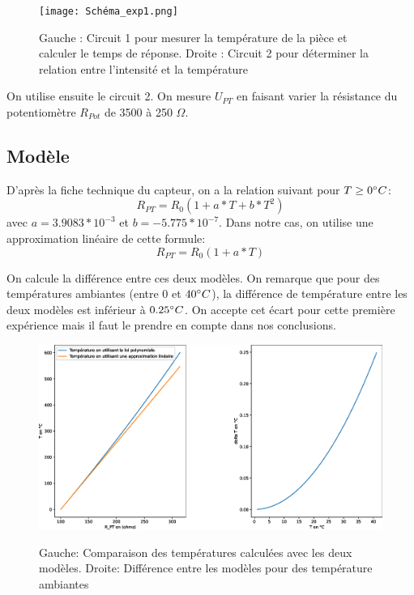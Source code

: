 \documentclass[12pt]{article}
\begin{document}
\newpage
\begin{figure}[h!]
	\begin{center}
		\texttt{[image: Schéma\_exp1.png]}
		\label{Schéma_exp1}
		\caption{Gauche : Circuit 1 pour mesurer la température de la pièce et calculer le temps de réponse. Droite : Circuit 2 pour déterminer la relation entre l'intensité et la température}
	\end{center}
\end{figure}

On utilise ensuite le circuit 2. On mesure $U_{PT}$ en faisant varier la résistance du potentiomètre $R_{Pot}$ de 3500 à 250 $\Omega$.

\subsection{Modèle}
D'après la fiche technique du capteur, on a la relation suivant pour $T\geq 0\degree C$:
\begin{equation}
R_{PT}=R_0(1+a*T+b*T^2)
\end{equation}
avec $a=3.9083*10^{-3}$ et $b=-5.775*10^{-7}$. Dans notre cas, on utilise une approximation linéaire de cette formule:
\begin{equation}
R_{PT}=R_0(1+a*T)
\label{Modèle_linéaire}
\end{equation}

On calcule la différence entre ces deux modèles. On remarque que pour des températures ambiantes (entre $0$ et $40\degree C$), la différence de température entre les deux modèles est inférieur à $0.25\degree C$. On accepte cet écart pour cette première expérience mais il faut le prendre en compte dans nos conclusions. 
\begin{figure}[h!]
	\begin{center}
		\includegraphics[scale=0.3]{Comparaison.eps}
		\label{Comparaison}
		\caption{Gauche: Comparaison des températures calculées avec les deux modèles. Droite: Différence entre les modèles pour des température ambiantes}
	\end{center}
\end{figure}
\end{document}
